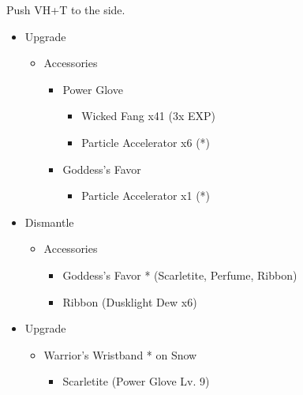 Push VH+T to the side.

\begin{upgrade}
	\begin{itemize}
		\item Upgrade
		      \begin{itemize}
			      \item Accessories
			            \begin{itemize}
				            \item Power Glove
				                  \begin{itemize}
					                  \item Wicked Fang x41 (3x EXP)
					                  \item Particle Accelerator x6 (*)
				                  \end{itemize}
				            \item Goddess's Favor
				                  \begin{itemize}
					                  \item Particle Accelerator x1 (*)
				                  \end{itemize}
			            \end{itemize}
		      \end{itemize}
		\item Dismantle
		      \begin{itemize}
			      \item Accessories
			            \begin{itemize}
				            \item Goddess's Favor * (Scarletite, Perfume, Ribbon)
				            \item Ribbon (Dusklight Dew x6)
			            \end{itemize}
		      \end{itemize}
		\item Upgrade
		      \begin{itemize}
			      \item Warrior's Wristband * on Snow
			            \begin{itemize}
				            \item Scarletite (Power Glove Lv. 9)
			            \end{itemize}
		      \end{itemize}
	\end{itemize}
\end{upgrade}
